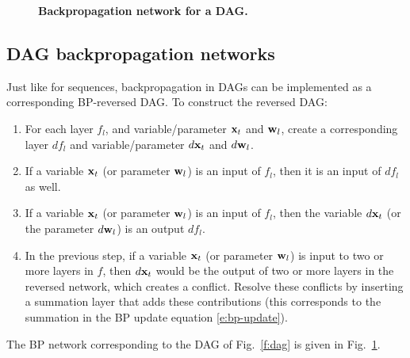 \begin{figure}[t]
\begin{center}
\end{center}
\vspace{-1em}
\caption{\textbf{Backpropagation network for a DAG.}}\label{f:dagbp}
\end{figure}

\subsection{DAG backpropagation networks}\label{s:bpnets-dag}

Just like for sequences, backpropagation in DAGs can be implemented as a corresponding BP-reversed DAG. To construct the reversed DAG:
\begin{enumerate}
\item For each layer $f_l$, and variable/parameter $\mathbf{x}_t$ and $\mathbf{w}_l$, create a corresponding layer $df_l$ and variable/parameter $d\mathbf{x}_t$ and $d\mathbf{w}_l$.
\item If a variable $\mathbf{x}_t$ (or parameter $\mathbf{w}_l$) is an input of $f_l$, then it is an input of $df_l$ as well.
\item If a variable $\mathbf{x}_t$ (or parameter $\mathbf{w}_l$) is an input of $f_l$, then the variable $d\mathbf{x}_t$ (or the parameter $d\mathbf{w}_l$) is an output $df_l$.
\item In the previous step, if a variable $\mathbf{x}_t$ (or parameter $\mathbf{w}_l$) is input to two or more layers in $f$, then $d\mathbf{x}_t$ would be the output of two or more layers in the reversed network, which creates a conflict. Resolve these conflicts by inserting a summation layer that adds these contributions (this corresponds to the summation in the BP update equation \eqref{e:bp-update}).
\end{enumerate}
The BP network corresponding to the DAG of Fig.~\ref{f:dag} is given in Fig.~\ref{f:dagbp}.


